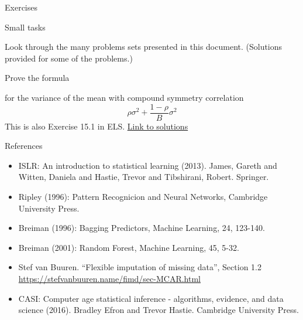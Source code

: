 \documentclass[
  ignorenonframetext,
]{beamer}
\providecommand{\tightlist}{%
  \setlength{\itemsep}{0pt}\setlength{\parskip}{0pt}}
\begin{document}
\begin{frame}{Exercises}
\protect\hypertarget{exercises}{}

\begin{block}{Small tasks}

Look through the many problems sets presented in this document.
(Solutions provided for some of the problems.)

\end{block}

\begin{block}{Prove the formula}

for the variance of the mean with compound symmetry correlation
\[\rho \sigma^2+\frac{1-\rho}{B} \sigma^2\] This is also Exercise 15.1
in ELS.
\href{https://github.com/mettelang/MA8701V2021/blob/main/Part2/L5solex.pdf}{Link
to solutions}

\end{block}

\end{frame}

\begin{frame}{References}
\protect\hypertarget{references}{}

\begin{itemize}
\tightlist
\item
  ISLR: An introduction to statistical learning (2013). James, Gareth
  and Witten, Daniela and Hastie, Trevor and Tibshirani, Robert.
  Springer.
\item
  Ripley (1996): Pattern Recognicion and Neural Networks, Cambridge
  University Press.
\item
  Breiman (1996): Bagging Predictors, Machine Learning, 24, 123-140.
\item
  Breiman (2001): Random Forest, Machine Learning, 45, 5-32.
\item
  Stef van Buuren. ``Flexible imputation of missing data'', Section 1.2
  \url{https://stefvanbuuren.name/fimd/sec-MCAR.html}
\item
  CASI: Computer age statistical inference - algorithms, evidence, and
  data science (2016). Bradley Efron and Trevor Hastie. Cambridge
  University Press.
\end{itemize}

\end{frame}
\end{document}

